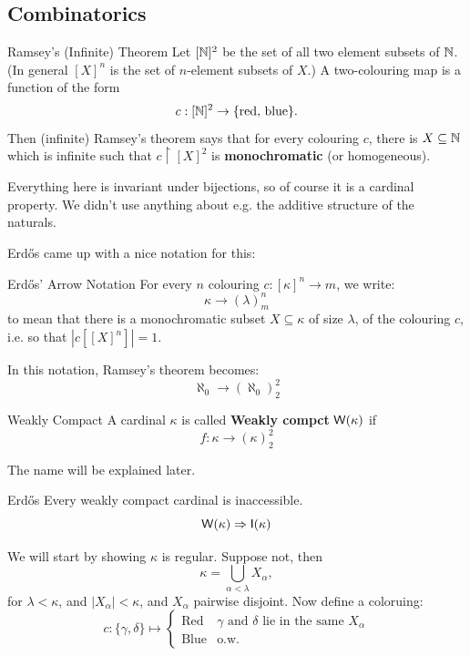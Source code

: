 \documentclass{article}
\begin{document}
\subsection{Combinatorics}
\begin{fancythm}{Ramsey's (Infinite) Theorem}
    Let $[\mathbb{N}]^{2}$ be the set of all two element subsets of $\mathbb{N}$. (In general $[X]^{n}$ is the set of $n$-element subsets of $X$.) A two-colouring map is a function of the form \[ c: [\mathbb{N}]^{2} \to \{\text{red},\,\text{blue}\}.\]
    Then (infinite) Ramsey's theorem says that for every colouring $c$, there is $X \subseteq \mathbb{N}$ which is infinite such that $c\upharpoonright [X]^{2}$ is \textbf{monochromatic} (or homogeneous).
\end{fancythm}
\begin{remark*}
    Everything here is invariant under bijections, so of course it is a cardinal property. We didn't use anything about e.g. the additive structure of the naturals.
\end{remark*}
Erd\H{o}s came up with a nice notation for this:
\begin{fancydefine}{Erd\H{o}s' Arrow Notation}
    For every $n$ colouring $c: [\kappa]^{n} \to m$, we write: \[ \kappa \to (\lambda)^{n}_{m}\] to mean that there is a monochromatic subset $X \subseteq \kappa$ of size $\lambda$, of the colouring $c$, i.e. so that $|c[[X]^{n}]|=1$.
\end{fancydefine}
\begin{ex*}
    In this notation, Ramsey's theorem becomes: \[ \aleph_{0} \to (\aleph_{0})^{2}_{2}\]
\end{ex*}
\begin{fancydefine}{Weakly Compact}
    A cardinal $\kappa$ is called \textbf{Weakly compct} $\mathsf{W}(\kappa)$ if \[ f : \kappa \to (\kappa)^{2}_{2}\]
\end{fancydefine}
\begin{remark*}
    The name will be explained later.
\end{remark*}
\begin{fancythm}{Erd\H{o}s}
    Every weakly compact cardinal is inaccessible. \[ \mathsf{W}(\kappa) \Rightarrow \mathsf{I}(\kappa)\]
\end{fancythm}
\proof We will start by showing $\kappa$ is regular. Suppose not, then \[\kappa = \bigcup_{\alpha<\lambda}  X_{\alpha},\]
for $\lambda <\kappa$, and $|X_{\alpha}|<\kappa$, and $X_{\alpha}$ pairwise disjoint. Now define a coloruing: \[ c: \{\gamma, \delta\} \mapsto \begin{cases}
    \text{Red} & \text{$\gamma$ and $\delta$ lie in the same $X_{\alpha}$}\\
    \text{Blue} & \text{o.w.}
\end{cases}
\]
\end{document}
